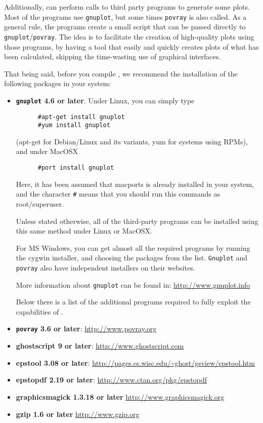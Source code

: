 Additionally, \DTK{} can perform calls to third party programs to generate some plots.
Most of the programs use \texttt{gnuplot}, but some times \texttt{povray} is also called.
As a general rule, the programs create a small script that can be passed directly to
\texttt{gnuplot}/\texttt{povray}. The idea is to facilitate the creation of
high-quality plots using those programs, by having a tool that easily and quickly creates plots
of what has been calculated, skipping the time-wasting use of graphical interfaces.

That being said, before you compile \DTK{}, we recommend the installation of the following packages
in your system:
\begin{itemize}
   \item \textbf{\texttt{gnuplot} 4.6 or later}. Under Linux, you can simply type
   \begin{verbatim}
      #apt-get install gnuplot
      #yum install gnuplot
   \end{verbatim}
   (apt-get for Debian/Linux and its variants, yum for systems using RPMs), and under MacOSX
   \begin{verbatim}
      #port install gnuplot
   \end{verbatim}
   Here, it has been assumed that macports is already installed in your system, and the character \texttt{\#} means that you should run this commands as root/superuser.
   
Unless stated otherwise, all of the third-party programs can be installed using this same method
under Linux or MacOSX.

For MS Windows, you can get almost all the required programs by running the cygwin installer,
and choosing the packages from the list. \texttt{Gnuplot} and \texttt{povray} also have independent
installers on their websites.

More information about \texttt{gnuplot} can be found in: \url{http://www.gnuplot.info}

Below there is a list of the additional programs required to fully exploit the capabilities of \DTK.

   \item \textbf{\texttt{povray} 3.6 or later}: \url{http://www.povray.org}
   \item \textbf{ghostscript 9 or later}: \url{http://www.ghostscript.com}
   \item \textbf{epstool 3.08 or later}: \url{http://pages.cs.wisc.edu/~ghost/gsview/epstool.htm}
   \item \textbf{epstopdf 2.19 or later}: \url{http://www.ctan.org/pkg/epstopdf}
   \item \textbf{graphicsmagick 1.3.18 or later} \url{http://www.graphicsmagick.org}
   \item \textbf{gzip 1.6 or later} \url{http://www.gzip.org}
\end{itemize}

